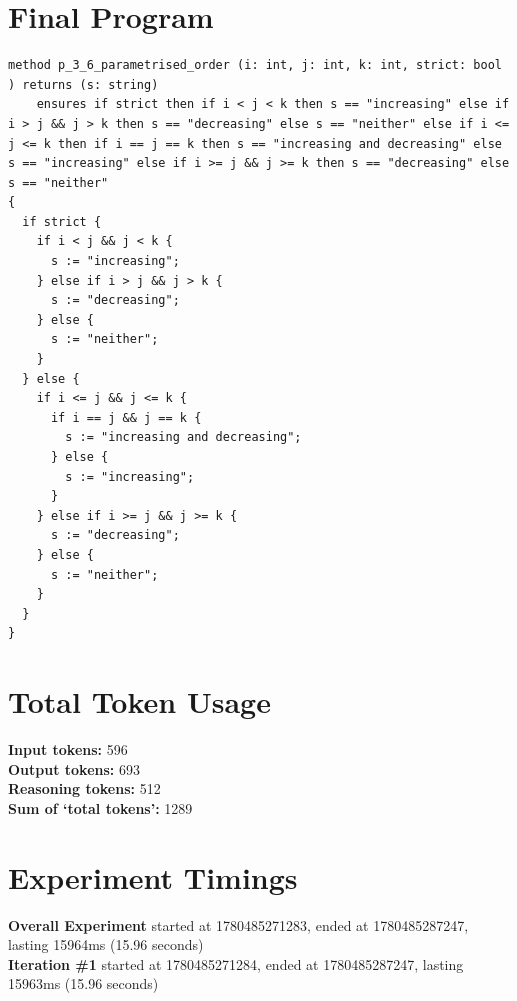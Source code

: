 \documentclass{article}
\begin{document}
\section*{Final Program}
\begin{lstlisting}
method p_3_6_parametrised_order (i: int, j: int, k: int, strict: bool ) returns (s: string)
	ensures if strict then if i < j < k then s == "increasing" else if i > j && j > k then s == "decreasing" else s == "neither" else if i <= j <= k then if i == j == k then s == "increasing and decreasing" else s == "increasing" else if i >= j && j >= k then s == "decreasing" else s == "neither"
{
  if strict {
    if i < j && j < k {
      s := "increasing";
    } else if i > j && j > k {
      s := "decreasing";
    } else {
      s := "neither";
    }
  } else {
    if i <= j && j <= k {
      if i == j && j == k {
        s := "increasing and decreasing";
      } else {
        s := "increasing";
      }
    } else if i >= j && j >= k {
      s := "decreasing";
    } else {
      s := "neither";
    }
  }
}
\end{lstlisting}
\section*{Total Token Usage}
\textbf{Input tokens: }596
\\\textbf{Output tokens: }693
\\\textbf{Reasoning tokens: }512
\\\textbf{Sum of `total tokens': }1289
\section*{Experiment Timings}
\textbf{Overall Experiment} started at 1780485271283, ended at 1780485287247, lasting 15964ms (15.96 seconds)
\\\textbf{Iteration \#1} started at 1780485271284, ended at 1780485287247, lasting 15963ms (15.96 seconds)
\end{document}
